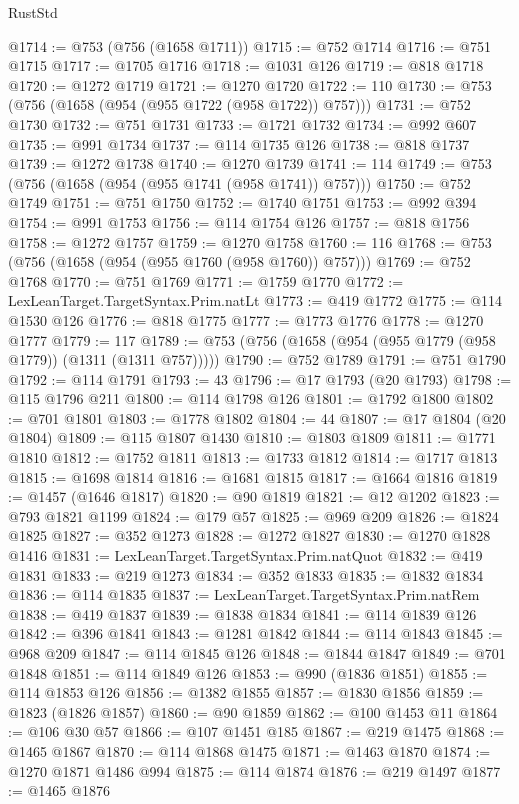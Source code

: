 \begin{lexlean}{RustStd}
\begin{coremodule}
@1714 := @753 (@756 (@1658 @1711))
@1715 := @752 @1714
@1716 := @751 @1715
@1717 := @1705 @1716
@1718 := @1031 @126
@1719 := @818 @1718
@1720 := @1272 @1719
@1721 := @1270 @1720
@1722 := 110
@1730 := @753 (@756 (@1658 (@954 (@955 @1722 (@958 @1722)) @757)))
@1731 := @752 @1730
@1732 := @751 @1731
@1733 := @1721 @1732
@1734 := @992 @607
@1735 := @991 @1734
@1737 := @114 @1735 @126
@1738 := @818 @1737
@1739 := @1272 @1738
@1740 := @1270 @1739
@1741 := 114
@1749 := @753 (@756 (@1658 (@954 (@955 @1741 (@958 @1741)) @757)))
@1750 := @752 @1749
@1751 := @751 @1750
@1752 := @1740 @1751
@1753 := @992 @394
@1754 := @991 @1753
@1756 := @114 @1754 @126
@1757 := @818 @1756
@1758 := @1272 @1757
@1759 := @1270 @1758
@1760 := 116
@1768 := @753 (@756 (@1658 (@954 (@955 @1760 (@958 @1760)) @757)))
@1769 := @752 @1768
@1770 := @751 @1769
@1771 := @1759 @1770
@1772 := LexLeanTarget.TargetSyntax.Prim.natLt
@1773 := @419 @1772
@1775 := @114 @1530 @126
@1776 := @818 @1775
@1777 := @1773 @1776
@1778 := @1270 @1777
@1779 := 117
@1789 := @753 (@756 (@1658 (@954 (@955 @1779 (@958 @1779)) (@1311 (@1311 @757)))))
@1790 := @752 @1789
@1791 := @751 @1790
@1792 := @114 @1791
@1793 := 43
@1796 := @17 @1793 (@20 @1793)
@1798 := @115 @1796 @211
@1800 := @114 @1798 @126
@1801 := @1792 @1800
@1802 := @701 @1801
@1803 := @1778 @1802
@1804 := 44
@1807 := @17 @1804 (@20 @1804)
@1809 := @115 @1807 @1430
@1810 := @1803 @1809
@1811 := @1771 @1810
@1812 := @1752 @1811
@1813 := @1733 @1812
@1814 := @1717 @1813
@1815 := @1698 @1814
@1816 := @1681 @1815
@1817 := @1664 @1816
@1819 := @1457 (@1646 @1817)
@1820 := @90 @1819
@1821 := @12 @1202
@1823 := @793 @1821 @1199
@1824 := @179 @57
@1825 := @969 @209
@1826 := @1824 @1825
@1827 := @352 @1273
@1828 := @1272 @1827
@1830 := @1270 @1828 @1416
@1831 := LexLeanTarget.TargetSyntax.Prim.natQuot
@1832 := @419 @1831
@1833 := @219 @1273
@1834 := @352 @1833
@1835 := @1832 @1834
@1836 := @114 @1835
@1837 := LexLeanTarget.TargetSyntax.Prim.natRem
@1838 := @419 @1837
@1839 := @1838 @1834
@1841 := @114 @1839 @126
@1842 := @396 @1841
@1843 := @1281 @1842
@1844 := @114 @1843
@1845 := @968 @209
@1847 := @114 @1845 @126
@1848 := @1844 @1847
@1849 := @701 @1848
@1851 := @114 @1849 @126
@1853 := @990 (@1836 @1851)
@1855 := @114 @1853 @126
@1856 := @1382 @1855
@1857 := @1830 @1856
@1859 := @1823 (@1826 @1857)
@1860 := @90 @1859
@1862 := @100 @1453 @11
@1864 := @106 @30 @57
@1866 := @107 @1451 @185
@1867 := @219 @1475
@1868 := @1465 @1867
@1870 := @114 @1868 @1475
@1871 := @1463 @1870
@1874 := @1270 @1871 @1486 @994
@1875 := @114 @1874
@1876 := @219 @1497
@1877 := @1465 @1876

\end{coremodule}
\end{lexlean}
